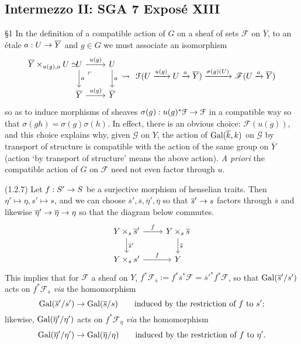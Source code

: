 \documentclass[deligne.tex]{subfiles}
\begin{document}
\subsection*{Intermezzo II: SGA 7 Exposé XIII}\label{sga7:XIII}
\S1 In the definition of a compatible action of $G$ on a sheaf of sets
$\mathcal F$ on $\overline Y$, to an étale $a:U\rightarrow\overline Y$ and $g\in G$
we must associate an isomorphism
\begin{equation*}\begin{tikzcd}
	\overline Y\times_{u(g),a}U\simeq &[-35pt]U\arrow[r,"u(g)"]\arrow[d,"a"]\arrow[dr,phantom,"\ulcorner",near start]&U\arrow[d,"a"] \\
	&\overline Y\arrow[r,"u(g)"]& \overline Y
\end{tikzcd}\rightsquigarrow
\begin{tikzcd}
	\mathcal F(U\xra{u(g)}U\xra{a}\overline Y)\xra{\sigma(g)(U)}\mathscr F(U\xra a\overline Y)
\end{tikzcd}\end{equation*}
so as to induce morphisms of sheaves
$\sigma(g):u(g)^*\mathcal F\rightarrow\mathcal F$ in a compatible way so that
$\sigma(gh)=\sigma(g)\sigma(h)$.
In effect, there is an obvious choice: $\mathcal F(u(g))$, and this choice
explains why, given $\mathcal G$ on $Y$, the action of
$\operatorname{Gal}(\overline k,k)$ on $\overline{\mathcal G}$ by transport of structure
is compatible with the action of the same group on $\overline Y$
(action `by transport of structure' means the above action).
\emph{A priori} the compatible action of $G$ on $\mathcal F$ need not even
factor through $u$.

(1.2.7) Let $f:S'\rightarrow S$ be a surjective morphism of henselian traits.
Then $\eta'\mapsto\eta,s'\mapsto s$, and we can choose
$\overline s',\overline s,\overline\eta',\overline\eta$ so that
$\overline s'\rightarrow s$ factors through $\overline s$ and likewise
$\overline\eta'\rightarrow\overline\eta\rightarrow\eta$ so that the diagram below commutes.
\begin{equation*}\begin{tikzcd}
	Y\times_s\overline s'\arrow[d,"\overline s'"]\arrow[r,"f"]
	&Y\times_s\overline s\arrow[d,"\overline s"] \\
	Y\times_s s'\arrow[r,"f"]&Y
\end{tikzcd}\end{equation*}
This implies that for $\mathcal F$ a sheaf on $Y$,
$f^*\mathcal F_{\overline s}:=f^*\overline s^*\mathcal F=\overline s'^*f^*\mathcal F$,
so that $\operatorname{Gal}(\overline s'/s')$ acts on
$f^*\mathcal F_{\overline s}$ \emph{via} the homomorphism
\begin{equation*}\operatorname{Gal}(\overline s'/s')\rightarrow\operatorname{Gal}(\overline s/s)
\qquad\text{induced by the restriction of $f$ to $s'$;}\end{equation*}
likewise, $\operatorname{Gal}(\overline\eta'/\eta')$ acts on $f^*\mathcal F_{\overline\eta}$ \emph{via} the homomorphism
\begin{equation*}\operatorname{Gal}(\overline\eta'/\eta')\rightarrow\operatorname{Gal}(\overline\eta/\eta)
\qquad\text{induced by the restriction of $f$ to $\eta'$.}\end{equation*}
\end{document}
